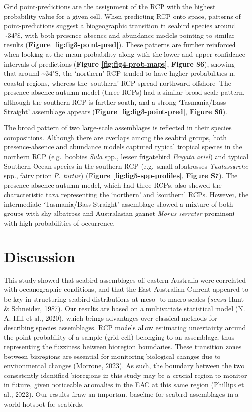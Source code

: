 \documentclass{article}
\begin{document}
\begin{linenumbers}
Grid point-predictions are the assignment of the RCP with the highest probability value for a given cell. When predicting RCP onto space, patterns of point-predictions suggest a biogeographic transition in seabird species around \textasciitilde34°S, with both presence-absence and abundance models pointing to similar results (\textbf{Figure \ref{fig:fig3-point-pred}}). These patterns are further reinforced when looking at the mean probability along with the lower and upper confidence intervals of predictions (\textbf{Figure \ref{fig:fig4-prob-maps}}, \textbf{Figure S6}), showing that around \textasciitilde34°S, the `northern' RCP tended to have higher probabilities in coastal regions, whereas the `southern' RCP spread northward offshore. The presence-absence-autumn model (three RCPs) had a similar broad-scale pattern, although the southern RCP is farther south, and a strong `Tasmania/Bass Straight' assemblage appears (\textbf{Figure \ref{fig:fig3-point-pred}}, \textbf{Figure S6}).

The broad pattern of two large-scale assemblages is reflected in their species compositions. Although there are overlaps among the seabird groups, both presence-absence and abundance models captured typical tropical species in the northern RCP (e.g.~boobies \emph{Sula} spp., lesser frigatebird \emph{Fregata ariel}) and typical Southern Ocean species in the southern RCP (e.g.~small albatrosses \emph{Thalassarche} spp., fairy prion \emph{P. turtur}) (\textbf{Figure \ref{fig:fig5-spp-profiles}}, \textbf{Figure S7}). The presence-absence-autumn model, which had three RCPs, also showed the characteristic taxa representing the `northern' and `southern' RCPs. However, the intermediate `Tasmania/Bass Straight' assemblage showed a mixture of both groups with shy albatross and Australasian gannet \emph{Morus serrator} prominent with high probabilities of occurrence.

\hypertarget{discussion}{%
\section{Discussion}\label{discussion}}

This study showed that seabird assemblages off eastern Australia were correlated with oceanographic conditions, and that the East Australian Current appeared to be key in structuring seabird distributions at meso- to macro scales (\emph{sensu} Hunt \& Schneider, 1987). Our results are based on a multivariate statistical model (N. A. Hill et al., 2020), which brings advantages over classical methods for describing species assemblages. RCP models allow estimating uncertainty around the point probability of a sample (grid cell) belonging to an assemblage, thus representing the fuzziness between bioregion boundaries. These transition zones between bioregions are essential for monitoring biological changes due to environmental changes (Morrone, 2023). As such, the boundary between the two consistently identified bioregions in this study may be a crucial region to monitor in future, given noticeable anomalies in the EAC at this same region (Phillips et al., 2022). Our results draw an important baseline for seabird assemblages in a world hotspot for seabirds.


\end{linenumbers}
\end{document}
